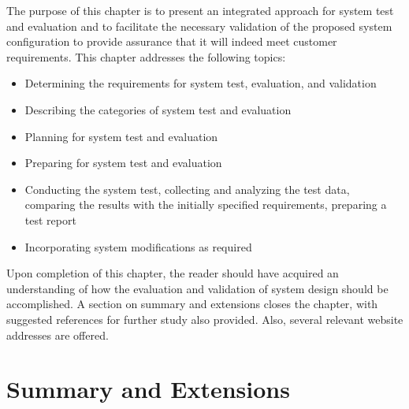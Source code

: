 The purpose of this chapter is to present an integrated approach for system test and evaluation and to facilitate the necessary validation of the proposed system configuration to provide assurance that it will indeed meet customer requirements. This chapter addresses the following topics:

\begin{itemize}
\item Determining the requirements for system test, evaluation, and validation
\item Describing the categories of system test and evaluation
\item Planning for system test and evaluation
\item Preparing for system test and evaluation
\item Conducting the system test, collecting and analyzing the test data, comparing the results with the initially specified requirements, preparing a test report
\item Incorporating system modifications as required
\end{itemize}

Upon completion of this chapter, the reader should have acquired an understanding of how the evaluation and validation of system design should be accomplished. A section on summary and extensions closes the chapter, with suggested references for further study also provided. Also, several relevant website addresses are offered.


\section{Summary and Extensions}


